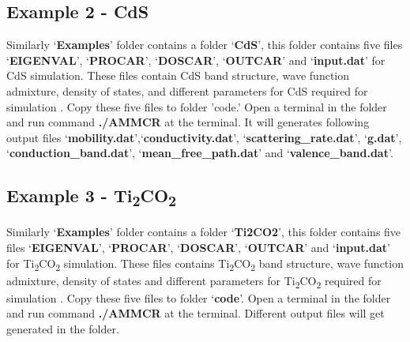 \documentclass[12pt]{article}
\begin{document}
\subsection{Example 2 - CdS}
Similarly \lq \textbf{Examples}\rq \hspace{0.5mm} folder contains a folder \lq \textbf{CdS}\rq \hspace{0.5mm}, this folder contains five files \lq \textbf{EIGENVAL}\rq \hspace{0.5mm}, \lq \textbf{PROCAR}\rq \hspace{0.5mm}, \lq \textbf{DOSCAR}\rq \hspace{0.5mm}, \lq \textbf{OUTCAR}\rq \hspace{0.5mm} and \lq \textbf{input.dat}\rq \hspace{0.5mm} for CdS simulation. These files contain CdS band structure, wave function admixture, density of states, and different parameters for CdS required for simulation \cite{anup2}. Copy these five files to folder 'code.' Open a terminal in the folder and run command \textbf{./AMMCR} at the terminal. It will generates following output files \lq \textbf{mobility.dat}\rq,\lq \textbf{conductivity.dat}\rq, \lq \textbf{scattering\_rate.dat}\rq, \lq \textbf{g.dat}\rq, \lq \textbf{conduction\_band.dat}\rq, \lq \textbf{mean\_free\_path.dat}\rq \hspace{0.5mm} and \lq \textbf{valence\_band.dat}\rq. 

\subsection{Example 3 - Ti\textsubscript{2}CO\textsubscript{2}}
Similarly \lq \textbf{Examples}\rq \hspace{0.5mm} folder contains a folder \lq \textbf{Ti2CO2}\rq \hspace{0.5mm}, this folder contains five files \lq \textbf{EIGENVAL}\rq \hspace{0.5mm}, \lq \textbf{PROCAR}\rq \hspace{0.5mm}, \lq \textbf{DOSCAR}\rq \hspace{0.5mm}, \lq \textbf{OUTCAR}\rq \hspace{0.5mm} and \lq \textbf{input.dat}\rq \hspace{0.5mm} for Ti\textsubscript{2}CO\textsubscript{2} simulation. These files contains Ti\textsubscript{2}CO\textsubscript{2} band structure, wave function admixture, density of states and different parameters for Ti\textsubscript{2}CO\textsubscript{2} required for simulation \cite{anup3}. Copy these five files to folder \lq \textbf{code}\rq \hspace{0.5mm}. Open a terminal in the folder and run command \textbf{./AMMCR} at the terminal. Different output files will get generated in the folder.


\end{document}
